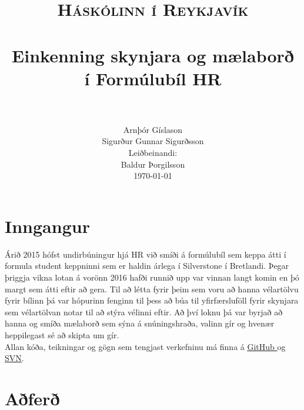 \documentclass[paper=a4, fontsize=11pt]{scrartcl}
\title{
		\usefont{OT1}{bch}{b}{n}
		\normalfont \normalsize \textsc{Háskólinn í Reykjavík} \\ [25pt]
		\horrule{0.5pt} \\[0.4cm]
		\huge Einkenning skynjara og mælaborð\\ í Formúlubíl HR \\
		\horrule{2pt} \\[0.5cm]
}
\author{
		\normalfont 								\normalsize
        Arnþór Gíslason\\[-3pt]		\normalsize
        Sigurður Gunnar Sigurðsson\\[-3pt]	\normalsize
        Leiðbeinandi:\\[-3pt]	\normalsize
		Baldur Þorgilsson\\[-3pt]	\normalsize
        \today
}
\date{}
\newcommand{\git}{\href{https://github.com/arnthorg/HVR2-2016/}{\underline{GitHub} }}
\numberwithin{equation}{section}		%
\numberwithin{figure}{section}			%
\numberwithin{table}{section}				%
\begin{document}
\maketitle
\section{Inngangur}
Árið 2015 hófst undirbúningur hjá HR við smíði á formúlubíl sem keppa átti í formula student keppninni sem er haldin árlega í Silverstone í Bretlandi. Þegar þriggja vikna lotan á vorönn 2016 hafði runnið upp var vinnan langt komin en þó margt sem átti eftir að gera. Til að létta fyrir þeim sem voru að hanna vélartölvu fyrir bílinn þá var hópurinn fenginn til þess að búa til yfirfærsluföll fyrir skynjara sem vélartölvan notar til að stýra vélinni eftir. Að því loknu þá var byrjað að hanna og smíða mælaborð sem sýna á snúningshraða, valinn gír og hvenær heppilegast sé að skipta um gír.\\
Allan kóða, teikningar og gögn sem tengjast verkefninu má finna á  \git og \href{https://projects.cs.ru.is/projects/rt-hvr2003-2016}{\underline{SVN}}.\\
\section{Aðferð}
\end{document}
